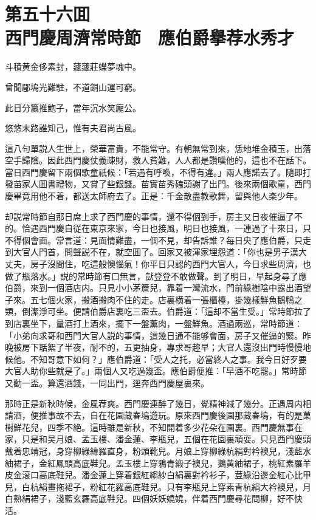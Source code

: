 
\chapter*{第五十六囬　\\西門慶周濟常時節　應伯爵擧荐水秀才}


\begin{myquote}
斗積黄金侈素封，蘧蘧莊蝶夢魂中。

曾聞郿塢光難駐，不道銅山運可窮。

此日分籝推鮑子，當年沉水笑龐公。

悠悠末路誰知己，惟有夫君尚古風。
\end{myquote}

這八句單説人生世上，榮華富貴，不能常守。有朝無常到來，恁地堆金積玉，出落空手歸陰。因此西門慶仗義疎財，救人貧難，人人都是讚嘆他的，這也不在話下。當日西門慶留下兩個歌童祇候：「若遇有呼喚，不得有違。」兩人應諾去了。隨即打發苗家人囬書禮物，又賞了些銀錢。苗實苗秀磕頭謝了出門。後來兩個歌童，西門慶畢竟用他不着，都送太師府去了。正是：千金散盡教歌舞，留與他人楽少年。

却説常時節自那日席上求了西門慶的事情，還不得個到手，房主又日夜催逼了不的。恰遇西門慶自従在東京來家，今日也接風，明日也接風，一連過了十來日，只不得個會面。常言道：見面情難盡，一個不見，却告訴誰？每日央了應伯爵，只走到大官人門首，問聲説不在，就空囬了。回家又被渾家埋怨道：「你也是男子漢大丈夫，房子沒間住，吃這般懊惱氣！你平日只認的西門大官人，今日求些周濟，也做了瓶落水。」説的常時節有口無言，獃登登不敢做聲。到了明日，早起身尋了應伯爵，來到一個酒店内。只見小小茅簷兒，靠着一灣流水，門前綠樹陰中露出酒望子來。五七個火家，搬酒搬肉不住的走。店裏横着一張櫃檯，掛幾樣鮮魚鵝鴨之類，倒潔淨可坐。便請伯爵店裏吃三盃去。伯爵道：「這却不當生受。」常時節拉了到店裏坐下，量酒打上酒來，擺下一盤薰肉，一盤鮮魚。酒過兩巡，常時節道：「小弟向求哥和西門大官人説的事情，這幾日通不能够會面，房子又催逼的緊。昨晚被房下聒絮了半夜，耐不的，五更抽身，專求哥趂早；大官人還沒出門時慢慢地候他。不知哥意下如何？」應伯爵道：「受人之托，必當終人之事。我今日好歹要大官人助你些就是了。」兩個人又吃過幾盃。應伯爵便推：「早酒不吃罷。」常時節又勸一盃。算還酒錢，一同出門，逕奔西門慶屋裏來。

那時正是新秋時候，金風荐爽。西門慶連醉了幾日，覺精神減了幾分。正遇周内相請酒，便推事故不去，自在花園藏春塢遊玩。原來西門慶後園那藏春塢，有的是菓樹鮮花兒，四季不絶。這時雖是新秋，不知開着多少花朵在園裏。西門慶無事在家，只是和吴月娘、孟玉樓、潘金蓮、李瓶兒，五個在花園裏頑耍。只見西門慶頭戴着忠靖冠，身穿柳綠緯羅直身，粉頭靴兒。月娘上穿柳綠杭絹對衿襖兒，淺藍水紬裙子，金紅鳳頭高底鞋兒。孟玉樓上穿鴉青緞子襖兒，鵝黄紬裙子，桃紅素羅羊皮金滚口高底鞋兒。潘金蓮上穿着銀紅縐紗白絹裏對衿衫子，荳綠沿邊金紅心比甲兒，白杭絹畫拖裙子，粉紅花羅高底鞋兒。只有李瓶兒上穿素青杭絹大衿襖兒，月白熟絹裙子，淺藍玄羅高底鞋兒。四個妖妖嬈嬈，伴着西門慶尋花問柳，好不快活。

